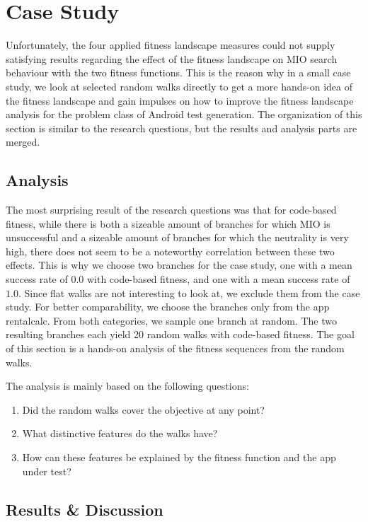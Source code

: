 \section{Case Study}
Unfortunately, the four applied fitness landscape measures could not supply satisfying results regarding the effect of the fitness landscape on MIO search behaviour with the two fitness functions.
This is the reason why in a small case study, we look at selected random walks directly to get a more hands-on idea of the fitness landscape and gain impulses on how to improve the fitness landscape analysis for the problem class of Android test generation.
The organization of this section is similar to the research questions, but the results and analysis parts are merged.

\subsection{Analysis}
The most surprising result of the research questions was that for code-based fitness, while there is both a sizeable amount of branches for which MIO is unsuccessful and a sizeable amount of branches for which the neutrality is very high, there does not seem to be a noteworthy correlation between these two effects.
This is why we choose two branches for the case study, one with a mean success rate of $0.0$ with code-based fitness, and one with a mean success rate of $1.0$.
Since flat walks are not interesting to look at, we exclude them from the case study.
For better comparability, we choose the branches only from the app rentalcalc.
From both categories, we sample one branch at random.
The two resulting branches each yield 20 random walks with code-based fitness.
The goal of this section is a hands-on analysis of the fitness sequences from the random walks.

The analysis is mainly based on the following questions:
\begin{enumerate}
	\item Did the random walks cover the objective at any point?
	\item What distinctive features do the walks have?
	\item How can these features be explained by the fitness function and the app under test?
\end{enumerate}
 

\subsection{Results \& Discussion}


